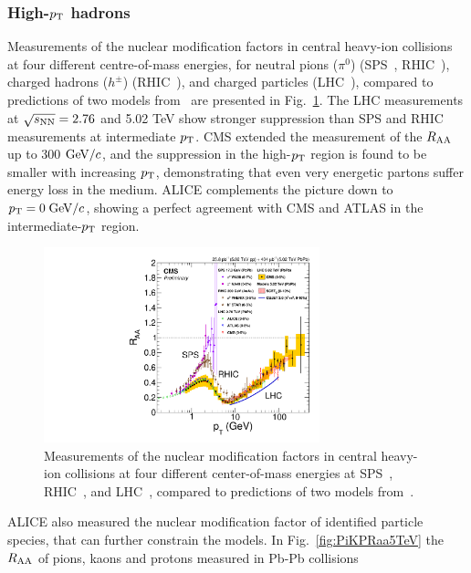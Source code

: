 \subsubsection{High-$p_{\rm T}$ hadrons}
\label{sec:HighPtPartons}
Measurements of the nuclear modification factors in central heavy-ion 
collisions at four different centre-of-mass energies, for neutral pions 
($\pi^0$) (SPS~\cite{Aggarwal:2001gn,dEnterria:2004cly,Alt:2007cd},
 RHIC~\cite{Adare:2012wg}),
 charged hadrons ($h^{\pm}$) (RHIC~\cite{Adams:2003kv}), and
  charged particles (LHC~\cite{Abelev:2012hxa,Aad:2015wga,CMS:2012aa}),
   compared to predictions of two models from~\cite{Chien:2015vja,Xu:2015bbz}
    are presented in Fig.~\ref{fig:CMSRaa}. The LHC measurements at
     $\sqrt{s_{\rm NN}} = 2.76$ and 5.02 TeV show stronger suppression than SPS 
     and RHIC measurements at intermediate $p_{\rm T}$. CMS extended the measurement of the 
     $R_{\rm AA}$ up to 300 $\mathrm{GeV}/c$, and the suppression in the high-$p_{\rm T}$ 
     region is found to be smaller with increasing $p_{\rm T}$, demonstrating 
     that even very energetic partons suffer energy loss in the medium.
      ALICE complements the picture down to $p_{\rm T} = 0 \; \mathrm{GeV}/c$, 
      showing a perfect agreement with CMS and ATLAS in the intermediate-$p_{\rm T}$ region.
\begin{figure}[!ht]
  \centering
  \includegraphics[width=8cm]{FigCap1/CMSRaa.pdf}
  \caption{Measurements of the nuclear modification factors in central heavy-ion collisions at four different center-of-mass energies at SPS~\cite{Aggarwal:2001gn,dEnterria:2004cly,Alt:2007cd}, RHIC~\cite{Adare:2012wg,Adams:2003kv}, and LHC~\cite{Abelev:2012hxa,Aad:2015wga,CMS:2012aa}, compared to predictions of two models from~\cite{Chien:2015vja,Xu:2015bbz}.}
  \label{fig:CMSRaa}
\end{figure}
ALICE also measured the nuclear modification factor of identified 
particle species, that can further constrain the models. In Fig.~\ref{fig:PiKPRaa5TeV}
 the $R_{\rm AA}$ of pions, kaons and protons measured in Pb-Pb collisions 
